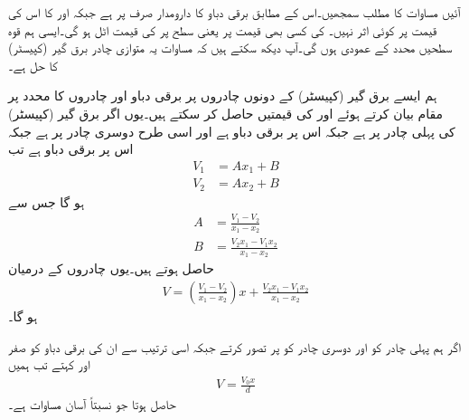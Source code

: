 آئیں مساوات  کا مطلب سمجھیں۔اس کے مطابق برقی دباو کا دارومدار صرف  پر ہے  جبکہ  اور  کا اس کی قیمت پر کوئی اثر نہیں۔ کی کسی بھی قیمت پر یعنی  سطح پر  کی قیمت اٹل ہو گی۔ایسی ہم قوہ سطحیں  محدد کے عمودی ہوں گی۔آپ دیکھ سکتے ہیں کہ مساوات  یہ متوازی چادر برق گیر (کپیسٹر)  کا حل ہے۔

ہم ایسے برق گیر (کپیسٹر)  کے دونوں چادروں پر برقی دباو اور چادروں کا  محدد پر مقام بیان کرتے ہوئے   اور  کی قیمتیں حاصل کر سکتے ہیں۔یوں اگر برق گیر (کپیسٹر)  کی پہلی  چادر   پر ہے جبکہ اس پر برقی دباو  ہے اور اسی طرح دوسری چادر  پر ہے جبکہ اس پر برقی دباو  ہے تب
\begin{align*}
V_1&=A x_1+B\\
V_2&=Ax_2+B
\end{align*}
ہو گا جس سے
\begin{align*}
A&=\frac{V_1-V_2}{x_1-x_2}\\
B&=\frac{V_2 x_1-V_1x_2}{x_1-x_2}
\end{align*}
حاصل ہوتے ہیں۔یوں چادروں کے درمیان
\begin{align}
V=\left(\frac{V_1-V_2}{x_1-x_2}\right)x+\frac{V_2 x_1-V_1x_2}{x_1-x_2}
\end{align}
ہو گا۔

اگر ہم پہلی  چادر کو  اور دوسری چادر کو  پر تصور کرتے جبکہ اسی ترتیب سے ان کی برقی دباو کو صفر اور  کہتے تب ہمیں
\begin{align}\label{مساوات_لاپلاس_کارتیسی_برقی_دباو}
V=\frac{V_0 x}{d}
\end{align}
حاصل ہوتا جو نسبتاً آسان مساوات ہے۔


